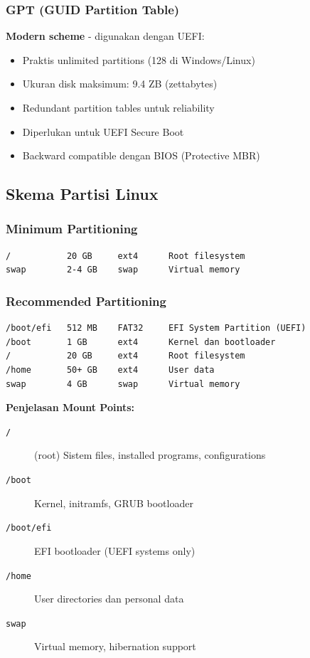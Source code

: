 \subsubsection{GPT (GUID Partition Table)}

\textbf{Modern scheme} - digunakan dengan UEFI:
\begin{itemize}
    \item Praktis unlimited partitions (128 di Windows/Linux)
    \item Ukuran disk maksimum: 9.4 ZB (zettabytes)
    \item Redundant partition tables untuk reliability
    \item Diperlukan untuk UEFI Secure Boot
    \item Backward compatible dengan BIOS (Protective MBR)
\end{itemize}

\subsection{Skema Partisi Linux}

\subsubsection{Minimum Partitioning}

\begin{lstlisting}[caption={Minimal partition scheme}]
/           20 GB     ext4      Root filesystem
swap        2-4 GB    swap      Virtual memory
\end{lstlisting}

\subsubsection{Recommended Partitioning}

\begin{lstlisting}[caption={Recommended partition scheme}]
/boot/efi   512 MB    FAT32     EFI System Partition (UEFI)
/boot       1 GB      ext4      Kernel dan bootloader
/           20 GB     ext4      Root filesystem
/home       50+ GB    ext4      User data
swap        4 GB      swap      Virtual memory
\end{lstlisting}

\textbf{Penjelasan Mount Points:}

\begin{description}
    \item[\texttt{/}] (root) Sistem files, installed programs, configurations
    \item[\texttt{/boot}] Kernel, initramfs, GRUB bootloader
    \item[\texttt{/boot/efi}] EFI bootloader (UEFI systems only)
    \item[\texttt{/home}] User directories dan personal data
    \item[\texttt{swap}] Virtual memory, hibernation support
\end{description}

